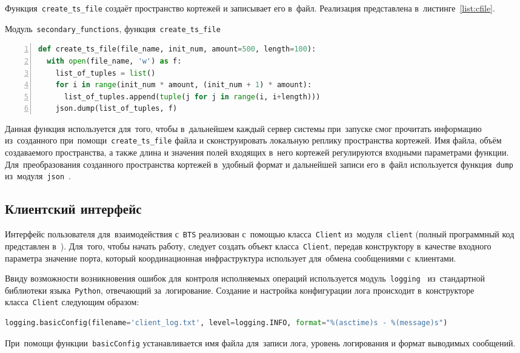 Функция~\texttt{create_ts_file} создаёт пространство кортежей и записывает его в~файл. Реализация представлена в~листинге~\ref{list:cfile}.
\begin{ListingEnv}[b]\caption{Модуль~\texttt{secondary\_functions}, функция~\texttt{create\_ts\_file}}\label{list:cfile}
	\begin{lstlisting}[language=Python, numbers=left]
def create_ts_file(file_name, init_num, amount=500, length=100):
  with open(file_name, 'w') as f:
    list_of_tuples = list()
    for i in range(init_num * amount, (init_num + 1) * amount):
      list_of_tuples.append(tuple(j for j in range(i, i+length)))
    json.dump(list_of_tuples, f)
	\end{lstlisting}
\end{ListingEnv}
Данная функция используется для~того, чтобы в~дальнейшем каждый сервер системы при~запуске смог прочитать информацию из~созданного при~помощи~\texttt{create_ts_file} файла и сконструировать локальную реплику пространства кортежей. Имя файла, объём создаваемого пространства, а также длина и значения полей входящих в~него кортежей регулируются входными параметрами функции. Для~преобразования созданного пространства кортежей в~удобный формат и дальнейшей записи его в~файл используется функция~\texttt{dump} из~модуля~\texttt{json}~\autocite{json}.


\subsection{Клиентский интерфейс}\label{subsec:3}
Интерфейс пользователя для~взаимодействия с~\texttt{BTS} реализован с~помощью класса~\texttt{Client} из~модуля~\texttt{client} (полный программный код представлен в~\autocite{mybts}). Для~того, чтобы начать работу, следует создать объект класса~\texttt{Client}, передав конструктору в~качестве входного параметра значение порта, который координационная инфраструктура использует для~обмена сообщениями с~клиентами.

Ввиду возможности возникновения ошибок для~контроля исполняемых операций используется модуль~\texttt{logging}~\autocite{logging} из~стандартной библиотеки языка~\texttt{Python}, отвечающий за~логирование. Создание и настройка конфигурации лога происходит в~конструкторе класса~\texttt{Client} следующим образом:
\begin{lstlisting}[language=Python]
  logging.basicConfig(filename='client_log.txt', level=logging.INFO, format="%(asctime)s - %(message)s")
\end{lstlisting}
При~помощи функции~\texttt{basicConfig} устанавливается имя файла для~записи лога, уровень логирования и формат выводимых сообщений.

